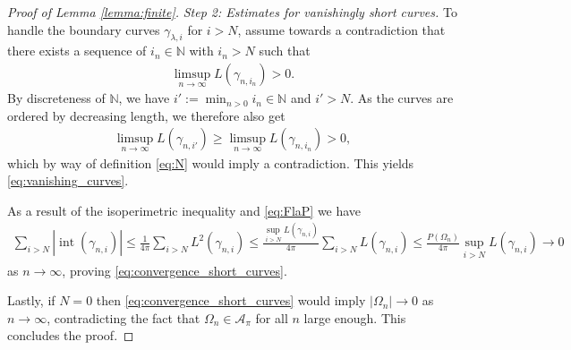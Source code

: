 \documentclass[11pt]{article}
\numberwithin{statement}{section}
\numberwithin{equation}{section}
\theoremstyle{remark}
\newcommand{\N}{\mathbb N}
\begin{document}
\begin{proof}[Proof of Lemma \ref{lemma:finite}]
        \textit{Step 2: Estimates for vanishingly short curves.}  To
        handle the boundary curves $\gamma_{\lambda,i}$ for $i > N$,
        assume towards a contradiction that there exists a sequence
        of $i_n \in \N$ with $i_n > N$ such that
	\begin{align}
		\limsup_{n\to \infty} L(\gamma_{n,i_n}) >0.
	\end{align}
	By discreteness of $\N$, we have $i' := \min_{n>0} i_n \in \N$ and $i' >N$.
	As the curves are ordered by decreasing length, we therefore also get
	\begin{align}
          \limsup_{n \to \infty} L(\gamma_{n,i'}) \geq
          \limsup_{n\to \infty} L(\gamma_{n,i_n}) >0, 
	\end{align}
	which by way of definition \eqref{eq:N} would imply a
        contradiction.  This yields \eqref{eq:vanishing_curves}.
        
        As a result of the isoperimetric inequality and
          \eqref{eq:FlaP} we have
	\begin{align}
          \sum_{i > N} | \operatorname{int}(\gamma_{n,i})|
          \leq
          \frac{1}{4\pi} \sum_{i > N} L^2(\gamma_{n,i})
          \leq
          \frac{ \sup_{i> N} L(\gamma_{n,i}) }{ 4 \pi} \sum_{i > N}
          L(\gamma_{n,i})  \leq \frac{P(\Omega_n)}{4\pi}  \sup_{i> N}
          L(\gamma_{n,i}) \to 0  
	\end{align}
	as $n \to \infty$, proving
        \eqref{eq:convergence_short_curves}.

        Lastly, if $N = 0$ then
          \eqref{eq:convergence_short_curves} would imply
          $|\Omega_n| \to 0$ as $n \to \infty$, contradicting the fact
          that $\Omega_n \in \mathcal A_\pi$ for all $n$ large
          enough. This concludes the proof.
\end{proof}
\end{document}

